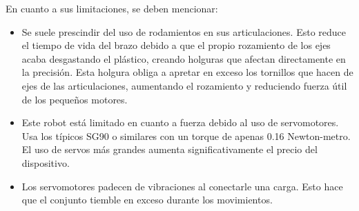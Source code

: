 \begin{itemize}
    En cuanto a sus limitaciones, se deben mencionar:
    \begin{itemize}
    \item Se suele prescindir del uso de rodamientos en sus articulaciones. Esto reduce el tiempo de vida del brazo debido a que el propio rozamiento 
    de los ejes acaba desgastando el plástico, creando holguras que afectan directamente en la precisión. Esta holgura obliga a apretar en exceso los tornillos 
    que hacen de ejes de las articulaciones, aumentando el rozamiento y reduciendo fuerza útil de los pequeños motores.
    \item Este robot está limitado en cuanto a fuerza debido al uso de servomotores. Usa los típicos SG90 o similares con un torque de apenas 
    0.16 Newton-metro. El uso de servos más grandes aumenta significativamente el precio del dispositivo. 
    \item Los servomotores padecen de vibraciones al conectarle una carga. Esto hace que el conjunto tiemble en exceso durante los movimientos.
    \end{itemize}
\end{itemize}\
\vspace{1cm}
